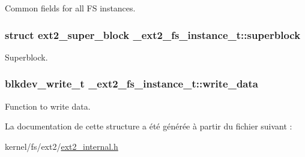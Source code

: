 \-Common fields for all \-F\-S instances. \hypertarget{struct__ext2__fs__instance__t_a81ad8719743e20da6f661c2586b56ad2}{
\subsubsection[{superblock}]{\setlength{\rightskip}{0pt plus 5cm}struct {\bf ext2\-\_\-super\-\_\-block} {\bf \-\_\-ext2\-\_\-fs\-\_\-instance\-\_\-t\-::superblock}}}\label{struct__ext2__fs__instance__t_a81ad8719743e20da6f661c2586b56ad2}
\-Superblock. \hypertarget{struct__ext2__fs__instance__t_a90d334c34e9aeea01be13fe1ed66ba7b}{
\subsubsection[{write\-\_\-data}]{\setlength{\rightskip}{0pt plus 5cm}blkdev\-\_\-write\-\_\-t {\bf \-\_\-ext2\-\_\-fs\-\_\-instance\-\_\-t\-::write\-\_\-data}}}\label{struct__ext2__fs__instance__t_a90d334c34e9aeea01be13fe1ed66ba7b}
\-Function to write data. 

\-La documentation de cette structure a été générée à partir du fichier suivant \-:\begin{DoxyCompactItemize}
\item 
kernel/fs/ext2/\hyperlink{ext2__internal_8h}{ext2\-\_\-internal.\-h}\end{DoxyCompactItemize}
